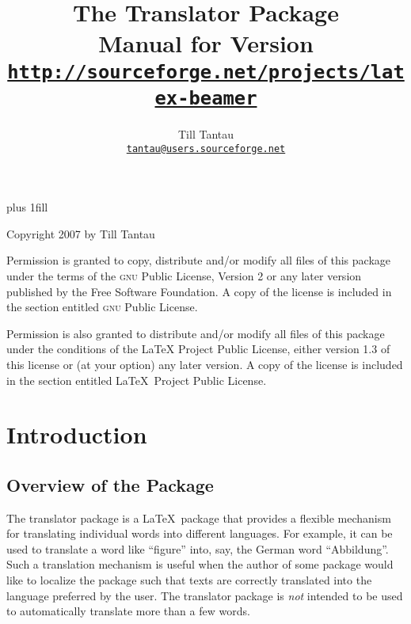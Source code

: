 \documentclass{ltxdoc}
\begin{document}
\title{The Translator Package\\
  Manual for Version \translatorversion\\[1mm]
\large\href{http://sourceforge.net/projects/latex-beamer}{\texttt{http://sourceforge.net/projects/latex-beamer}}}
\author{Till Tantau\\
  \href{mailto:tantau@users.sourceforge.net}{\texttt{tantau@users.sourceforge.net}}}


\maketitle

\vskip0pt plus 1fill

\parindent=0pt
Copyright 2007 by Till Tantau

\medskip  
Permission is granted to copy, distribute and/or modify all files of
this package under the terms of the \textsc{gnu} Public License, Version 2
or any later version published by the Free Software Foundation.
A copy of the license is included in the section entitled \textsc{gnu}
Public License.

\medskip  
Permission is also granted to distribute and/or modify all files of
this package under the conditions of the LaTeX
Project Public License, either version 1.3 of this license or (at
your option) any later version. A copy of the license is included in
the section entitled \LaTeX\ Project Public License. 

\clearpage

\tableofcontents

\clearpage


\section{Introduction}

\subsection{Overview of the Package}

The translator package is a \LaTeX\ package that provides a flexible
mechanism for translating individual words into different languages.
For example, it can be used to translate a word like ``figure'' into,
say, the German word ``Abbildung''. Such a translation mechanism is
useful when the author of some package would like to localize the
package such that texts are correctly translated into the language
preferred by the user. The translator package is \emph{not} intended
to be used to automatically translate more than a few words. 
\end{document}
